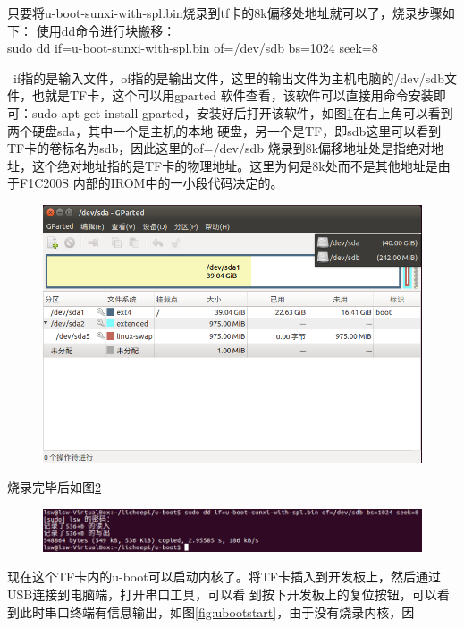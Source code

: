 只要将u-boot-sunxi-with-spl.bin烧录到tf卡的8k偏移处地址就可以了，烧录步骤如下：
使用dd命令进行块搬移：\\
sudo dd if=u-boot-sunxi-with-spl.bin of=/dev/sdb bs=1024 seek=8 \\
\begin{tcolorbox}[colback=red!5!white,colframe=red!75!black]
	\faBellO \  
	if指的是输入文件，of指的是输出文件，这里的输出文件为主机电脑的/dev/sdb文件，也就是TF卡，这个可以用gparted
	软件查看，该软件可以直接用命令安装即可：sudo apt-get install 
	gparted，安装好后打开该软件，如图\ref{fig:gparted}在右上角可以看到两个硬盘sda，其中一个是主机的本地
	硬盘，另一个是TF，即sdb这里可以看到TF卡的卷标名为sdb，因此这里的of=/dev/sdb
	烧录到8k偏移地址处是指绝对地址，这个绝对地址指的是TF卡的物理地址。这里为何是8k处而不是其他地址是由于F1C200S
	内部的IROM中的一小段代码决定的。
\end{tcolorbox}
\begin{figure}[htbp]
	\centering
	\includegraphics[width=1\linewidth]{chapter2/img/gparted}
	\caption{}
	\label{fig:gparted}
\end{figure}
烧录完毕后如图\ref*{fig:dd}
\begin{figure}[htbp]
	\centering
	\includegraphics[width=1\linewidth]{chapter2/img/dd}
	\caption{}
	\label{fig:dd}
\end{figure}
现在这个TF卡内的u-boot可以启动内核了。将TF卡插入到开发板上，然后通过USB连接到电脑端，打开串口工具，可以看
到按下开发板上的复位按钮，可以看到此时串口终端有信息输出，如图\ref{fig:ubootstart}，由于没有烧录内核，因
